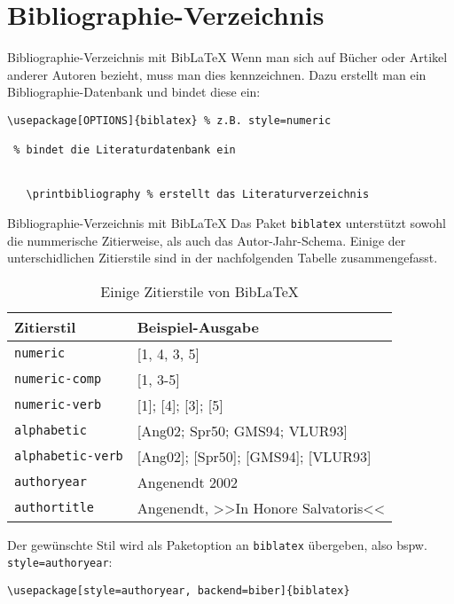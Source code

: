 \section{Bibliographie-Verzeichnis}
\begin{frame}[fragile]{Bibliographie-Verzeichnis mit Bib\LaTeX}
Wenn man sich auf Bücher oder Artikel anderer Autoren bezieht, muss man dies kennzeichnen. Dazu erstellt man ein Bibliographie-Datenbank und bindet diese ein:
\begin{lstlisting}[style=tex]
\usepackage[OPTIONS]{biblatex} % z.B. style=numeric

 % bindet die Literaturdatenbank ein


   \printbibliography % erstellt das Literaturverzeichnis

\end{lstlisting}
\end{frame}

\begin{frame}[fragile]{Bibliographie-Verzeichnis mit Bib\LaTeX}
Das Paket \texttt{biblatex} unterstützt sowohl die nummerische Zitierweise, als auch das Autor-Jahr-Schema. Einige der unterschidlichen Zitierstile sind in der nachfolgenden Tabelle zusammengefasst. 
\begin{table}
	\caption{Einige Zitierstile von Bib\LaTeX}
\begin{tabular}{ll}
	\hline
	Zitierstil & Beispiel-Ausgabe \\
	\hline
	\texttt{numeric} & [1, 4, 3, 5] \\
	\texttt{numeric-comp} & [1, 3-5] \\
	\texttt{numeric-verb} & [1]; [4]; [3]; [5] \\
	\texttt{alphabetic} & [Ang02; Spr50; GMS94; VLUR93] \\
	\texttt{alphabetic-verb} & [Ang02]; [Spr50]; [GMS94]; [VLUR93] \\
	\texttt{authoryear} & Angenendt 2002 \\
	\texttt{authortitle} & Angenendt, >>In Honore Salvatoris<< \\
	\hline
\end{tabular}
\end{table}

Der gewünschte Stil wird als Paketoption an \texttt{biblatex} übergeben, also bspw. \texttt{style=authoryear}:
\begin{lstlisting}[style=tex]
\usepackage[style=authoryear, backend=biber]{biblatex}
\end{lstlisting}
\end{frame}


